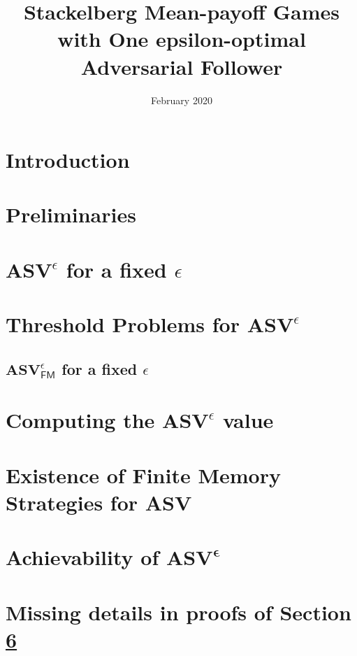 \documentclass{article}
\title{\textbf{Stackelberg Mean-payoff Games with One epsilon-optimal Adversarial Follower}}
\author{}
\date{February 2020}
\begin{document}
\maketitle

\section{Introduction} 
  \label{sec:intro}
  

\section{Preliminaries}
  \label{sec:prelim}
  

\section{$\mathbf{ASV}^{\epsilon}$ for a fixed $\epsilon$}
  

\section{Threshold Problems for $\mathbf{ASV}^{\epsilon}$}
  \label{sec:ThresholdProblem}
  
  \subsection{$\mathbf{ASV}^{\epsilon}_{\mathsf{FM}}$ for a fixed $\epsilon$}
    \label{sec:FMStrategy}
    

\section{Computing the $\mathbf{ASV}^{\epsilon}$ value}
  

\section{Existence of Finite Memory Strategies for ASV}
  \label{sec:FMASV}
  

\section{Achievability of $\mathbf{ASV^{\epsilon}}$}
  



\appendix
\pagebreak
\section{Missing details in proofs of Section \ref{sec:FMASV}}

\end{document}
